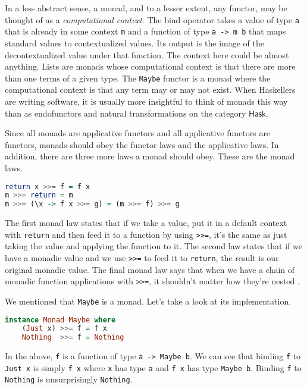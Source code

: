 \documentclass[MS, xcolor=dvipsnames]{wfuthesis}
\def\Hask{\mathsf{Hask}}
\theoremstyle{definition}
\begin{document}
In a less abstract sense, a monad, and to a lesser extent, any functor, may be thought of as a \emph{computational context}. The bind operator takes a value of type \lstinline{a} that is already in some context \lstinline{m} and a function of type \lstinline{a -> m b} that maps standard values to contextualized values. Its output is the image of the decontextualized value under that function. The context here could be almost anything. Lists are monads whose computational context is that there are more than one terms of a given type. The \lstinline{Maybe} functor is a monad where the computational context is that any term may or may not exist. When Haskellers are writing software, it is usually more insightful to think of monads this way than as endofunctors and natural transformations on the category $\Hask$. \par 
Since all monads are applicative functors and all applicative functors are functors, monads should obey the functor laws and the applicative laws. In addition, there are three more laws a monad should obey. These are the monad laws.
\begin{lstlisting}[language=Haskell]
return x >>= f = f x
m >>= return = m
m >>= (\x -> f x >>= g) = (m >>= f) >>= g
\end{lstlisting}
The first monad law states that if we take a value, put it in a default context with \lstinline{return} and then feed it to a function by using \lstinline{>>=}, it's the same as just taking the value and applying the function to it. The second law states that if we have a monadic value and we use \lstinline{>>=} to feed it to \lstinline{return}, the result is our original monadic value. The final monad law says that when we have a chain of monadic function applications with \lstinline{>>=}, it shouldn't matter how they're nested \cite{Lipovaca2011}. \par 
We mentioned that \lstinline{Maybe} is a monad. Let's take a look at its implementation. 
\begin{lstlisting}[language=Haskell]
instance Monad Maybe where
    (Just x) >>= f = f x
    Nothing  >>= f = Nothing
\end{lstlisting}
In the above, \lstinline{f} is a function of type \lstinline{a -> Maybe b}. We can see that binding \lstinline{f} to \lstinline{Just x} is simply \lstinline{f x} where \lstinline{x} has type \lstinline{a} and \lstinline{f x} has type \lstinline{Maybe b}. Binding \lstinline{f} to \lstinline{Nothing} is unsurprisingly \lstinline{Nothing}. \par 
\end{document}
